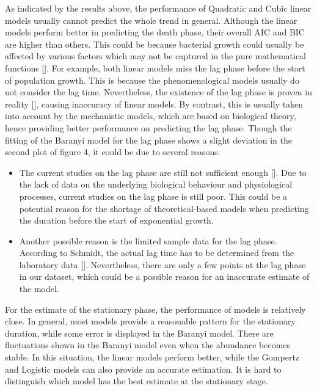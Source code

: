 \documentclass[11pt, oneside]{article}
\begin{document}
	As indicated by the results above, the performance of Quadratic and Cubic linear models usually cannot predict the whole trend in general. Although the linear models perform better in predicting the death phase, their overall AIC and BIC are higher than others. This could be because bacterial growth could usually be affected by various factors which may not be captured in the pure mathematical functions [\cite{sutherland2002behavioural}]. For example, both linear models miss the lag phase before the start of population growth. This is because the phenomenological models usually do not consider the lag time. Nevertheless, the existence of the lag phase is proven in reality [\cite{rolfe2012lag}], causing inaccuracy of linear models. By contrast, this is usually taken into account by the mechanistic models, which are based on biological theory, hence providing better performance on predicting the lag phase. Though the fitting of the Baranyi model for the lag phase shows a slight deviation in the second plot of figure 4, it could be due to several reasons:
	\begin{itemize}
	\item The current studies on the lag phase are still not sufficient enough [\cite{rolfe2012lag}]. Due to the lack of data on the underlying biological behaviour and physiological processes, current studies on the lag phase is still poor. This could be a potential reason for the shortage of theoretical-based models when predicting the duration before the start of exponential growth.
	\item Another possible reason is the limited sample data for the lag phase. According to Schmidt, the actual lag time has to be determined from the laboratory data [\cite{yilmaz2011identifiability}]. Nevertheless, there are only a few points at the lag phase in our dataset, which could be a possible reason for an inaccurate estimate of the model.
	\end{itemize}
	\noindent For the estimate of the stationary phase, the performance of models is relatively close. In general, most models provide a reasonable pattern for the stationary duration, while some error is displayed in the Baranyi model. There are fluctuations shown in the Baranyi model even when the abundance becomes stable. In this situation, the linear models perform better, while the Gompertz and Logistic models can also provide an accurate estimation. It is hard to distinguish which model has the best estimate at the stationary stage.
	\bigbreak
\end{document}
